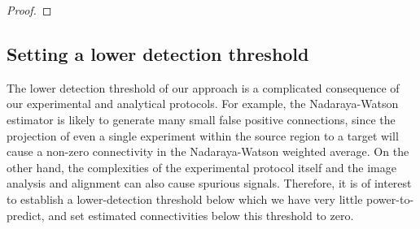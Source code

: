\begin{proof}

\end{proof}

\newpage

\subsection{Setting a lower detection threshold}
\label{supp_sec:methods_lower}

The lower detection threshold of our approach is a complicated consequence of our experimental and analytical protocols.
For example, the Nadaraya-Watson estimator is likely to generate many small false positive connections, since the projection of even a single experiment within the source region to a target will cause a non-zero connectivity in the Nadaraya-Watson weighted average.
On the other hand, the complexities of the experimental protocol itself and the image analysis and alignment can also cause spurious signals.
Therefore, it is of interest to establish a lower-detection threshold below which we have very little power-to-predict, and set estimated connectivities below this threshold to zero.

